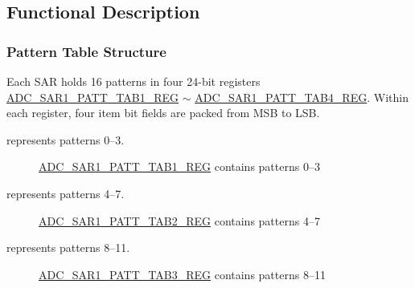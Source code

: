 \documentclass[main\_\_EN.tex]{subfiles}
\begin{document}
\subsection{Functional Description}
\label{sec:adc-pattern-func-descr}

\subsubsection{Pattern Table Structure}
\label{sec:adc-pattern-tab}
Each SAR holds 16 patterns in four 24-bit registers \hyperref[regdesc:ADCSAR1PATTTAB1REG]{ADC\_SAR1\_PATT\_TAB1\_REG} $\sim$ \hyperref[regdesc:ADCSAR1PATTTAB4REG]{ADC\_SAR1\_PATT\_TAB4\_REG}. Within each register, four item bit fields are packed from MSB to LSB.

%
%
%
%
\begin{regdesc}\begin{reglist}
\item [item \regindex{x}] represents patterns 0--3.
\end{reglist}\end{regdesc}
\vspace{-2em}
\begin{figure}[H]
    \centering
    \caption{\hyperref[regdesc:ADCSAR1PATTTAB1REG]{ADC\_SAR1\_PATT\_TAB1\_REG} contains patterns 0--3}
    \label{fig:adc-sar1-patt-tab1-reg-entry0-entry3}
\end{figure}

%
%
%
%
\begin{regdesc}\begin{reglist}
\item [item \regindex{x}] represents patterns 4--7.
\end{reglist}\end{regdesc}
\vspace{-2em}
\begin{figure}[H]
    \centering
    \caption{\hyperref[regdesc:ADCSAR1PATTTAB2REG]{ADC\_SAR1\_PATT\_TAB2\_REG} contains patterns 4--7}
    \label{fig:adc-sar1-patt-tab2-reg-entry4-entry7}
\end{figure}

%
%
%
%
\begin{regdesc}\begin{reglist}
\item [item \regindex{x}] represents patterns 8--11.
\end{reglist}\end{regdesc}
\vspace{-2em}
\begin{figure}[H]
    \centering
    \caption{\hyperref[regdesc:ADCSAR1PATTTAB3REG]{ADC\_SAR1\_PATT\_TAB3\_REG} contains patterns 8--11}
    \label{fig:adc-sar1-patt-tab3-reg-entry8-entry11}
\end{figure}
\end{document}
